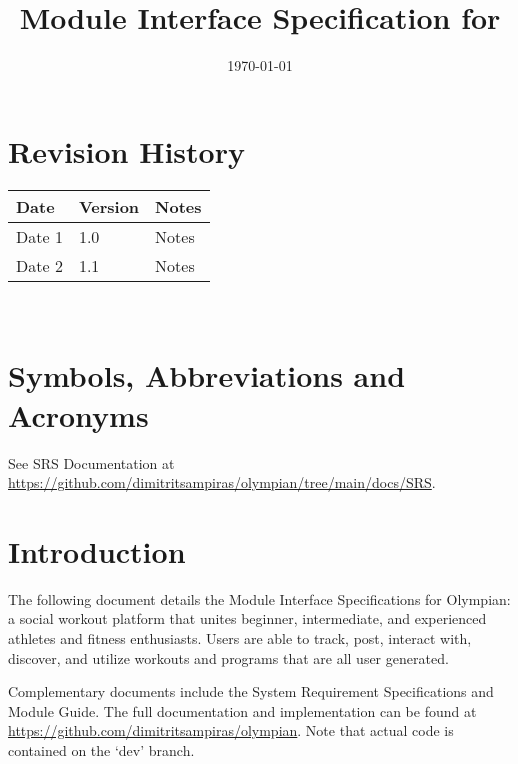 \documentclass[12pt, titlepage]{article}
\begin{document}
\title{Module Interface Specification for \progname{}}

\author{\authname}

\date{\today}

\maketitle


\section{Revision History}

\begin{tabularx}{\textwidth}{p{3cm}p{2cm}X}
\toprule {\bf Date} & {\bf Version} & {\bf Notes}\\
\midrule
Date 1 & 1.0 & Notes\\
Date 2 & 1.1 & Notes\\
\bottomrule
\end{tabularx}

~\newpage

\section{Symbols, Abbreviations and Acronyms}

See SRS Documentation at \url{https://github.com/dimitritsampiras/olympian/tree/main/docs/SRS}.

\newpage

\tableofcontents

\newpage


\section{Introduction}

The following document details the Module Interface Specifications for Olympian: a social workout platform that unites beginner, intermediate, and experienced athletes and fitness enthusiasts. Users are able to track, post, interact with, discover, and utilize workouts and programs that are all user generated.

Complementary documents include the System Requirement Specifications
and Module Guide.  The full documentation and implementation can be
found at \url{https://github.com/dimitritsampiras/olympian}.
Note that actual code is contained on the `dev' branch.
\end{document}
